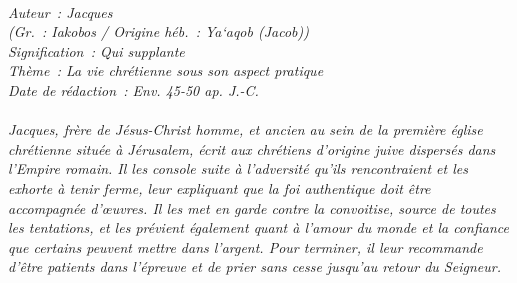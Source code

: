 \BFont
\noindent\hrulefill
{\footnotesize
\textit{
\bigskip
{\centering{}
\\Auteur~: Jacques
\\(Gr.~: Iakobos / Origine héb.~: Ya`aqob (Jacob))
\\Signification~: Qui supplante
\\Thème~: La vie chrétienne sous son aspect pratique
\\Date de rédaction~: Env. 45-50 ap. J.-C.\\}
}
\textit{
\\Jacques, frère de Jésus-Christ homme, et ancien au sein de la première église chrétienne située à Jérusalem, écrit aux chrétiens d'origine juive dispersés dans l'Empire romain. Il les console suite à l'adversité qu'ils rencontraient et les exhorte à tenir ferme, leur expliquant que la foi authentique doit être accompagnée d'œuvres. Il les met en garde contre la convoitise, source de toutes les tentations, et les prévient également quant à l'amour du monde et la confiance que certains peuvent mettre dans l'argent. Pour terminer, il leur recommande d'être patients dans l'épreuve et de prier sans cesse jusqu'au retour du Seigneur.\bigskip
}
}
\par\nobreak\noindent\hrulefill
